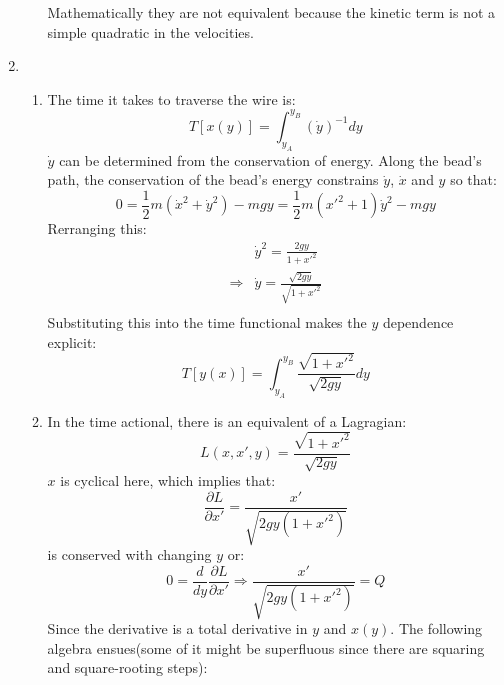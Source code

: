 \documentclass[12pt,a4]{article}
\begin{document}
\begin{enumerate}
\begin{enumerate}
        Mathematically they are not equivalent because the kinetic term is not a simple quadratic in the velocities.
    \end{enumerate}
  \item
    \begin{enumerate}
      \item
        The time it takes to traverse the wire is:
        \begin{equation*}
          T[x(y)] = \int_{y_A}^{y_B} (\dot y)^{-1} dy
        \end{equation*}
        $\dot y$ can be determined from the conservation of energy.
        Along the bead's path, the conservation of the bead's energy constrains $\dot y$, $\dot x$ and $y$ so that:
        \begin{equation*}
          0 = \frac{1}{2} m (\dot x^2 + \dot y^2) - m g y = \frac{1}{2} m (x'^2 + 1) \dot y^2 - m g y
        \end{equation*}
        Rerranging this:
        \begin{align*}
                      & \dot y^2 = \frac{2gy}{1 + x'^2}\\
          \Rightarrow & \dot y = \frac{\sqrt{2gy}}{\sqrt{1 + x'^2}}\\
        \end{align*}
        Substituting this into the time functional makes the $y$ dependence explicit:
        \begin{equation*}
          T[y(x)] = \int_{y_A}^{y_B} \frac{\sqrt{1 + x'^2}}{\sqrt{2gy}} dy
        \end{equation*}
      \item
        In the time actional, there is an equivalent of a Lagragian:
        \begin{equation*}
          L(x, x', y) = \frac{\sqrt{1 + x'^2}}{\sqrt{2gy}}
        \end{equation*}
        $x$ is cyclical here, which implies that:
        \begin{equation*}
          \frac{\partial L}{\partial x'} = \frac{x'}{\sqrt{2gy(1 + x'^2)}}
        \end{equation*}
        is conserved with changing $y$ or:
        \begin{equation*}
          0 = \frac{d}{dy}\frac{\partial L}{\partial x'} \Rightarrow \frac{x'}{\sqrt{2gy(1 + x'^2)}} = Q
        \end{equation*}
        Since the derivative is a total derivative in $y$ and $x(y)$.
        The following algebra ensues(some of it might be superfluous since there are squaring and square-rooting steps):

\end{enumerate}
\end{enumerate}
\end{document}
